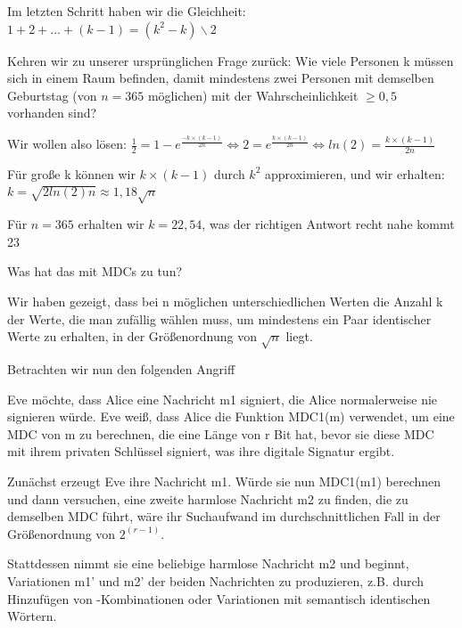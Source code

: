 \documentclass[a4paper]{article}
\begin{document}
\begin{multicols}{3}
\begin{itemize*}
            \item Im letzten Schritt haben wir die Gleichheit: $1+2+...+(k-1)=(k^2 - k)\backslash 2$
            \item Kehren wir zu unserer ursprünglichen Frage zurück: Wie viele Personen k müssen sich in einem Raum befinden, damit mindestens zwei Personen mit demselben Geburtstag (von $n=365$ möglichen) mit der Wahrscheinlichkeit $\geq 0,5$ vorhanden sind?
            \begin{itemize*}
                  \item Wir wollen also lösen: $\frac{1}{2}=1-e^{\frac{-k\times(k-1)}{2n}}\Leftrightarrow 2=e^{\frac{k\times(k-1)}{2n}}\Leftrightarrow ln(2)=\frac{k\times(k-1)}{2n}$
                  \item Für große k können wir $k\times(k-1)$ durch $k^2$ approximieren, und wir erhalten: $k=\sqrt{2 ln(2)n}\approx 1,18\sqrt{n}$
                  \item Für $n=365$ erhalten wir $k=22,54$, was der richtigen Antwort recht nahe kommt 23
            \end{itemize*}
            \item Was hat das mit MDCs zu tun?
            \item Wir haben gezeigt, dass bei n möglichen unterschiedlichen Werten die Anzahl k der Werte, die man zufällig wählen muss, um mindestens ein Paar identischer Werte zu erhalten, in der Größenordnung von $\sqrt{n}$ liegt.
            \item Betrachten wir nun den folgenden Angriff
            \begin{itemize*}
                  \item Eve möchte, dass Alice eine Nachricht m1 signiert, die Alice normalerweise nie signieren würde. Eve weiß, dass Alice die Funktion MDC1(m) verwendet, um eine MDC von m zu berechnen, die eine Länge von r Bit hat, bevor sie diese MDC mit ihrem privaten Schlüssel signiert, was ihre digitale Signatur ergibt.
                  \item Zunächst erzeugt Eve ihre Nachricht m1. Würde sie nun MDC1(m1) berechnen und dann versuchen, eine zweite harmlose Nachricht m2 zu finden, die zu demselben MDC führt, wäre ihr Suchaufwand im durchschnittlichen Fall in der Größenordnung von $2^{(r-1)}$.
                  \item Stattdessen nimmt sie eine beliebige harmlose Nachricht m2 und beginnt, Variationen m1' und m2' der beiden Nachrichten zu produzieren, z.B. durch Hinzufügen von -Kombinationen oder Variationen mit semantisch identischen Wörtern.

\end{itemize*}
\end{itemize*}
\end{multicols}
\end{document}
